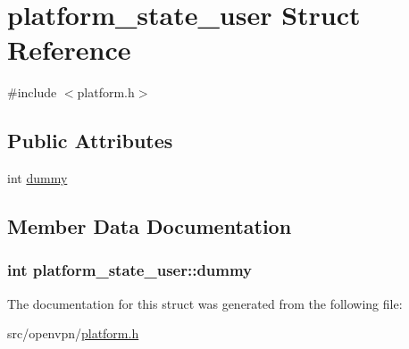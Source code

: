 \hypertarget{structplatform__state__user}{}\section{platform\+\_\+state\+\_\+user Struct Reference}
\label{structplatform__state__user}


{\ttfamily \#include $<$platform.\+h$>$}

\subsection*{Public Attributes}
\begin{DoxyCompactItemize}
\item 
int \hyperlink{structplatform__state__user_abfb86511134b74c1029a3144e567c4cb}{dummy}
\end{DoxyCompactItemize}


\subsection{Member Data Documentation}
\hypertarget{structplatform__state__user_abfb86511134b74c1029a3144e567c4cb}{}
\subsubsection[{dummy}]{\setlength{\rightskip}{0pt plus 5cm}int platform\+\_\+state\+\_\+user\+::dummy}\label{structplatform__state__user_abfb86511134b74c1029a3144e567c4cb}


The documentation for this struct was generated from the following file\+:\begin{DoxyCompactItemize}
\item 
src/openvpn/\hyperlink{platform_8h}{platform.\+h}\end{DoxyCompactItemize}

